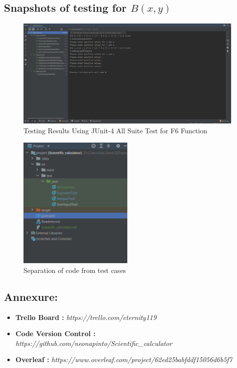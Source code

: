 \documentclass[letterpaper, 11pt]{article}
\begin{document}
    \subsection{Snapshots of testing for $B(x,y)$}

        \begin{figure}[htb]
            \includegraphics[width=1.1\textwidth]{Testcases.PNG}
            \centering
            \caption{Testing Results Using JUnit-4 All Suite Test for F6 Function}
            \label{fig:junit}
        \end{figure} 
        
        \begin{figure}[htb]
            \includegraphics[width=0.5\textwidth]{test_organisation.PNG}
            \centering
            \caption{Separation of code from test cases}
            \label{fig:test_org}
        \end{figure} 

    \subsection{Annexure:}
        \begin{itemize}
          \item \textbf{Trello Board :} \textit{https://trello.com/eternity119}
          \item \textbf{Code Version Control :} \textit{https://github.com/neonapinto/Scientific\_calculator}
          \item \textbf{Overleaf :} \textit{https://www.overleaf.com/project/62ed25babfddf15056d6b5f7}
        \end{itemize}
        
\end{document}
